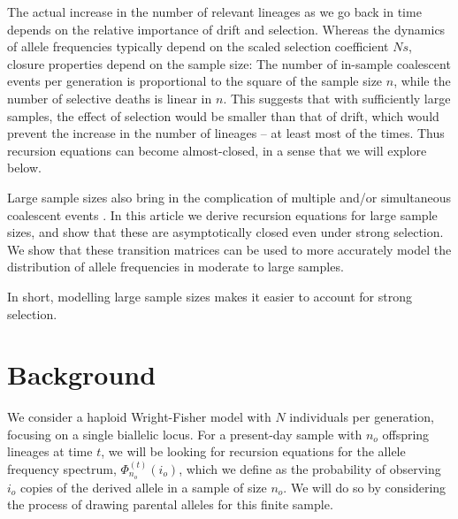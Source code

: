 \documentclass[review]{elsarticle}
\newcommand{\afs}[2]{\Phi_{#1}^{(#2)}}
\begin{document}
The actual increase in the number of relevant lineages as we go back in time depends on the relative
importance of drift and selection. Whereas the dynamics of allele frequencies typically 
depend on the scaled selection coefficient $Ns$, closure properties depend on the sample size:
The number of in-sample coalescent events per generation is proportional to
the square of the sample size $n$, while the number of selective deaths is linear in $n$. This
suggests that with sufficiently large samples, the effect of selection would be smaller than that of
drift, which would prevent the increase in the number of lineages -- at least most of the times.
Thus recursion equations can become almost-closed, in a sense that we will explore below.

Large sample sizes also bring in the complication of multiple and/or simultaneous coalescent events \citep{BhaskarEtAl2014}. 
In this article we derive recursion equations for large sample sizes, and show that these are asymptotically closed 
even under strong selection. We show that these transition matrices can be used to more accurately model the distribution 
of allele frequencies in moderate to large samples. 

In short, modelling large sample sizes makes it easier to account for strong selection. 


\section{Background}
\label{sec:background}

We consider a haploid Wright-Fisher model with $N$ individuals per generation, focusing on a single biallelic locus. For a
present-day sample with $n_o$ offspring lineages at time $t$, we will be looking for recursion
equations for the allele frequency spectrum, $\afs{n_o}{t}(i_o)$, which we define as the probability of observing
$i_o$ copies of the derived allele in a sample of size $n_o.$ We will do so by considering the process of drawing parental alleles
for this finite sample. 
\end{document}
